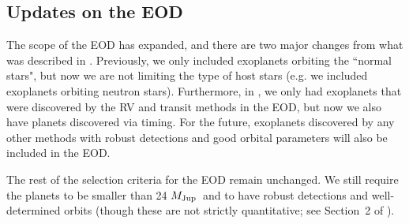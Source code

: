 \documentclass[11pt,preprint]{aastex}
\def\mjup{$M_{\rm Jup}$}
\begin{document}
\begin{CJK*}{UTF8}{gbsn}

\section{Updates on the EOD}\label{sec:update}

The scope of the EOD has expanded, and there are two major changes
from what was described in \cite{Wright2011}. Previously, we only
included exoplanets orbiting the ``normal stars", but now we are not
limiting the type of host stars (e.g. we included exoplanets orbiting
neutron stars). Furthermore, in \cite{Wright2011}, we only had
exoplanets that were discovered by the RV and transit methods in the
EOD, but now we also have planets discovered via timing. For the
future, exoplanets discovered by any other methods with robust
detections and good orbital parameters will also be included in the
EOD.

The rest of the selection criteria for the EOD remain unchanged. We
still require the planets to be smaller than 24 \mjup\ and to have
robust detections and well-determined orbits (though these are not
strictly quantitative; see Section~2 of \citealt{Wright2011}).


\end{CJK*}
\end{document}
